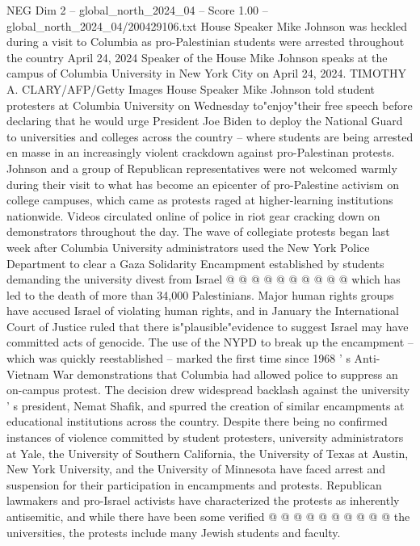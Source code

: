 \begin{textsample}{NEG Dim 2 – global\_north\_2024\_04 – Score 1.00 – global\_north\_2024\_04/200429106.txt}  \label{ex:f2_neg_275}
House Speaker Mike Johnson was heckled during a visit to Columbia as pro-Palestinian students were arrested throughout the country April 24, 2024 Speaker of the House Mike Johnson speaks at the campus of Columbia University in New York City on April 24, 2024.
TIMOTHY A.
CLARY/AFP/Getty Images House Speaker Mike Johnson told student protesters at Columbia University on Wednesday to"enjoy"their free speech before declaring that he would urge President Joe Biden to deploy the National Guard to universities and colleges across the country -- where students are being arrested en masse in an increasingly violent crackdown against pro-Palestinan protests.
Johnson and a group of Republican representatives were not welcomed warmly during their visit to what has become an epicenter of pro-Palestine activism on college campuses, which came as protests raged at higher-learning institutions nationwide.
Videos circulated online of police in riot gear cracking down on demonstrators throughout the day.
The wave of collegiate protests began last week after Columbia University administrators used the New York Police Department to clear a Gaza Solidarity Encampment established by students demanding the university divest from Israel @ @ @ @ @ @ @ @ @ @ which has led to the death of more than 34,000 Palestinians.
Major human rights groups have accused Israel of violating human rights, and in January the International Court of Justice ruled that there is"plausible"evidence to suggest Israel may have committed acts of genocide.
The use of the NYPD to break up the encampment -- which was quickly reestablished -- marked the first time since 1968 ' s Anti-Vietnam War demonstrations that Columbia had allowed police to suppress an on-campus protest.
The decision drew widespread backlash against the university ' s president, Nemat Shafik, and spurred the creation of similar encampments at educational institutions across the country.
Despite there being no confirmed instances of violence committed by student protesters, university administrators at Yale, the University of Southern California, the University of Texas at Austin, New York University, and the University of Minnesota have faced arrest and suspension for their participation in encampments and protests.
Republican lawmakers and pro-Israel activists have characterized the protests as inherently antisemitic, and while there have been some verified @ @ @ @ @ @ @ @ @ @ the universities, the protests include many Jewish students and faculty.

\end{textsample}
